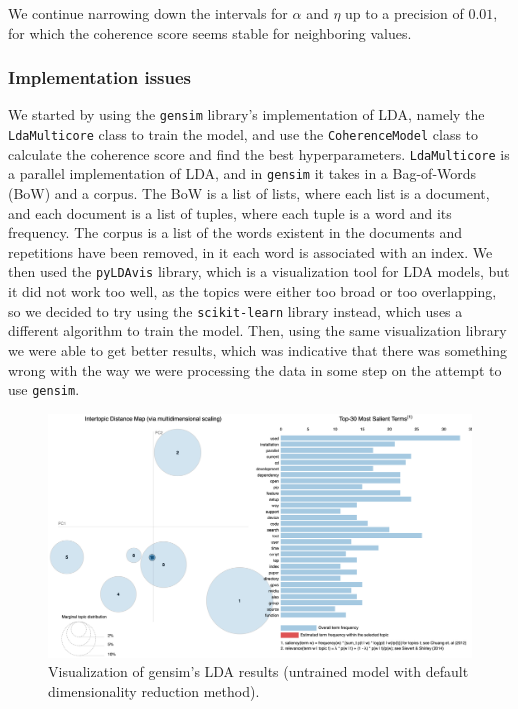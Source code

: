\documentclass[11pt, conference, onecolumn, final]{IEEEtran}
\begin{document}
We continue narrowing down the intervals for $\alpha$ and $\eta$ up to a
precision of $0.01$, for which the coherence score seems stable for neighboring
values.

\subsubsection{Implementation issues} \label{sec:methodology:statistics-issues}

We started by using the \verb|gensim| library's implementation of LDA, namely
the \verb|LdaMulticore| class to train the model, and use the
\verb|CoherenceModel| class to calculate the coherence score and find the best
hyperparameters.
\verb|LdaMulticore| is a parallel implementation of LDA, and in \verb|gensim|
it takes in a Bag-of-Words (BoW) and a corpus.
The BoW is a list of lists, where each list is a document, and each document is
a list of tuples, where each tuple is a word and its frequency.
The corpus is a list of the words existent in the documents and repetitions
have been removed, in it each word is associated with an index.
We then used the \verb|pyLDAvis| library, which is a visualization tool for LDA
models, but it did not work too well, as the topics were either too broad or
too overlapping, so we decided to try using the \verb|scikit-learn| library
instead, which uses a different algorithm to train the model.
Then, using the same visualization library we were able to get better results,
which was indicative that there was something wrong with the way we were
processing the data in some step on the attempt to use \verb|gensim|.

\begin{figure}[H]
    \centering
    \includegraphics[width=\linewidth]{gensim-untrained.png}
    \caption{Visualization of gensim's LDA results (untrained model with
        default dimensionality reduction method).}
    \label{fig:lda_gensim_untrained}
\end{figure}
\end{document}

